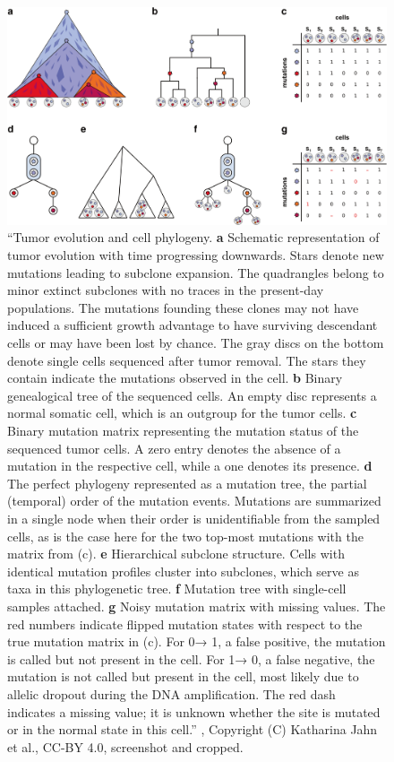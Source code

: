 \begin{figure}
    \includegraphics[width=\textwidth]{figures/example_tree.png}
    \centering
    \caption{``Tumor evolution and cell phylogeny. \textbf{a} Schematic representation of tumor evolution with time progressing downwards. Stars denote new mutations leading to subclone expansion. The quadrangles belong to minor extinct subclones with no traces in the present-day populations. The mutations founding these clones may not have induced a sufficient growth advantage to have surviving descendant cells or may have been lost by chance. The gray discs on the bottom denote single cells sequenced after tumor removal. The stars they contain indicate the mutations observed in the cell. \textbf{b} Binary genealogical tree of the sequenced cells. An empty disc represents a normal somatic cell, which is an outgroup for the tumor cells. \textbf{c} Binary mutation matrix representing the mutation status of the sequenced tumor cells. A zero entry denotes the absence of a mutation in the respective cell, while a one denotes its presence. \textbf{d} The perfect phylogeny represented as a mutation tree, the partial (temporal) order of the mutation events. Mutations are summarized in a single node when their order is unidentifiable from the sampled cells, as is the case here for the two top-most mutations with the matrix from (c). \textbf{e} Hierarchical subclone structure. Cells with identical mutation profiles cluster into subclones, which serve as taxa in this phylogenetic tree. \textbf{f} Mutation tree with single-cell samples attached. \textbf{g} Noisy mutation matrix with missing values. The red numbers indicate flipped mutation states with respect to the true mutation matrix in (c). For 0→ 1, a false positive, the mutation is called but not present in the cell. For 1→ 0, a false negative, the mutation is not called but present in the cell, most likely due to allelic dropout during the DNA amplification. The red dash indicates a missing value; it is unknown whether the site is mutated or in the normal state in this cell.'' \cite{tree2016}, Copyright (C) Katharina Jahn et al., CC-BY 4.0, screenshot and cropped.}
    \label{fig:exampletree}
\end{figure}

